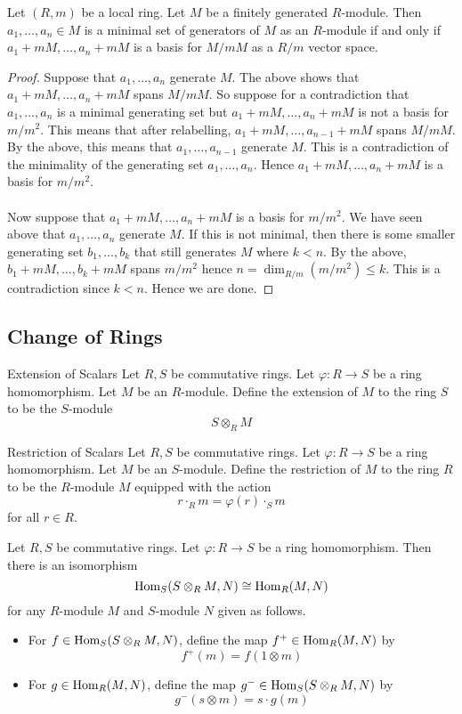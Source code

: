 \documentclass[a4paper]{article}
\begin{document}
\begin{prp}{}{} Let $(R,m)$ be a local ring. Let $M$ be a finitely generated $R$-module. Then $a_1,\dots,a_n\in M$ is a minimal set of generators of $M$ as an $R$-module if and only if $a_1+mM,\dots,a_n+mM$ is a basis for $M/mM$ as a $R/m$ vector space. \tcbline
\begin{proof}
Suppose that $a_1,\dots,a_n$ generate $M$. The above shows that $a_1+mM,\dots,a_n+mM$ spans $M/mM$. So suppose for a contradiction that $a_1,\dots,a_n$ is a minimal generating set but $a_1+mM,\dots,a_n+mM$ is not a basis for $m/m^2$. This means that after relabelling, $a_1+mM,\dots,a_{n-1}+mM$ spans $M/mM$. By the above, this means that $a_1,\dots,a_{n-1}$ generate $M$. This is a contradiction of the minimality of the generating set $a_1,\dots,a_n$. Hence $a_1+mM,\dots,a_n+mM$ is a basis for $m/m^2$. \\~\\

Now suppose that $a_1+mM,\dots,a_n+mM$ is a basis for $m/m^2$. We have seen above that $a_1,\dots,a_n$ generate $M$. If this is not minimal, then there is some smaller generating set $b_1,\dots,b_k$ that still generates $M$ where $k<n$. By the above, $b_1+mM,\dots,b_k+mM$ spans $m/m^2$ hence $n=\dim_{R/m}(m/m^2)\leq k$. This is a contradiction since $k<n$. Hence we are done. 
\end{proof}
\end{prp}

\subsection{Change of Rings}
\begin{defn}{Extension of Scalars}{} Let $R,S$ be commutative rings. Let $\varphi:R\to S$ be a ring homomorphism. Let $M$ be an $R$-module. Define the extension of $M$ to the ring $S$ to be the $S$-module $$S\otimes_R M$$
\end{defn}

\begin{defn}{Restriction of Scalars}{} Let $R,S$ be commutative rings. Let $\varphi:R\to S$ be a ring homomorphism. Let $M$ be an $S$-module. Define the restriction of $M$ to the ring $R$ to be the $R$-module $M$ equipped with the action $$r\cdot_R m=\varphi(r)\cdot_S m$$ for all $r\in R$. 
\end{defn}

\begin{thm}{}{} Let $R,S$ be commutative rings. Let $\varphi:R\to S$ be a ring homomorphism. Then there is an isomorphism $$\operatorname{Hom}_S(S\otimes_R M,N)\cong\operatorname{Hom}_R(M,N)$$ for any $R$-module $M$ and $S$-module $N$ given as follows. 
\begin{itemize}
\item For $f\in\operatorname{Hom}_S(S\otimes_R M,N)$, define the map $f^+\in\operatorname{Hom}_R(M,N)$ by $$f^+(m)=f(1\otimes m)$$
\item For $g\in\operatorname{Hom}_R(M,N)$, define the map $g^-\in\operatorname{Hom}_S(S\otimes_RM,N)$ by $$g^-(s\otimes m)=s\cdot g(m)$$
\end{itemize}
\end{thm}
\end{document}
